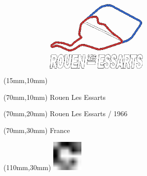 \null\newpage
\begin{textblock*}{50mm}(15mm,10mm)%
\includegraphics[width=50mm]{LG/ROU.png}
\end{textblock*}
\begin{textblock*}{130mm}(70mm,10mm)%
{\fontsize{20}{20}\selectfont Rouen Les Essarts}\\
\end{textblock*}
\begin{textblock*}{120mm}(70mm,20mm)%
{\fontsize{16}{16}\selectfont Rouen Les Essarts / 1966}\\
\end{textblock*}
\begin{textblock*}{120mm}(70mm,30mm)%
{\fontsize{12}{12}\selectfont France}
\end{textblock*}
\begin{textblock*}{30mm}(110mm,30mm)%
\centering
\includegraphics[height=15mm]{icons/fa-rotate-right.pdf}
\end{textblock*}
